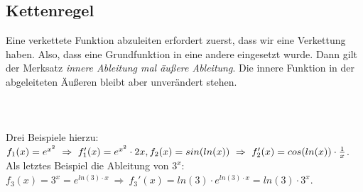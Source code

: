 \subsection{Kettenregel}
	Eine verkettete Funktion abzuleiten erfordert zuerst, dass wir eine Verkettung
	haben. Also, dass eine Grundfunktion in eine andere eingesetzt wurde. Dann gilt
	der Merksatz \emph{innere Ableitung mal äußere Ableitung}. Die innere Funktion
	in der abgeleiteten Äußeren bleibt aber unverändert stehen.
	\\ \\
	\formel{\[h(x)=f(g(x))\ \Rightarrow\ h'(x)=f'(g(x))\cdot g'(x)\]}
	\\ \\
	Drei Beispiele hierzu: \(f_1(x)=e^{x^2}\ \Rightarrow\ f_1'(x)=e^{x^2}\cdot
	2x,\\
	f_2(x)=sin(ln(x))\ \Rightarrow\ f_2'(x)=cos(ln(x))\cdot \frac{1}{x}\).\\
	Als letztes Beispiel die Ableitung von \(3^x\): \(f_3(x)=3^x=e^{ln(3)\cdot x}\
	\Rightarrow\ f_3'(x)=ln(3)\cdot e^{ln(3)\cdot x}=ln(3)\cdot 3^x\).
	
